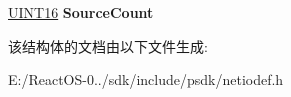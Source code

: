 \begin{DoxyCompactItemize}
\begin{tabbing}
\end{tabbing}\item 
\mbox{\label{struct___m_l_d_v2___q_u_e_r_y___h_e_a_d_e_r_a6f2b8b2af09825199f2f4339abdbc2ba}} 
\hyperlink{_processor_bind_8h_a09f1a1fb2293e33483cc8d44aefb1eb1}{U\+I\+N\+T16} {\bfseries Source\+Count}
\end{DoxyCompactItemize}


该结构体的文档由以下文件生成\+:\begin{DoxyCompactItemize}
\item 
E\+:/\+React\+O\+S-\/0../sdk/include/psdk/netiodef.\+h\end{DoxyCompactItemize}
